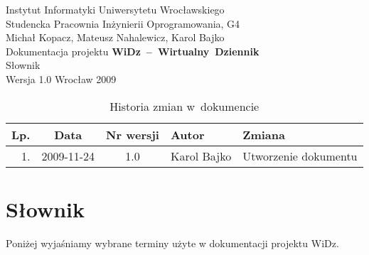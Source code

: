 \documentclass[12pt,leqno,twoside]{mwart}
\begin{document}
\begin{titlepage}
\begin{center}
Instytut Informatyki Uniwersytetu Wrocławskiego \\
Studencka Pracownia Inżynierii Oprogramowania, G4 \\
\vspace{4cm}
\Large Michał Kopacz, Mateusz Nahalewicz, Karol Bajko \\
\vspace{0.5cm}
\huge Dokumentacja projektu \mbox{\textbf{WiDz -- Wirtualny Dziennik}} \\ \Large Słownik\\
\vspace{1cm}
\normalsize Wersja 1.0
\vfill
\normalsize Wrocław 2009
\end{center}
\end{titlepage}

\newpage

\begin{table}
	\centering
	\caption{Historia zmian w~dokumencie}
		\begin{tabular}{|r|c|c|l|l|}
		\hline
		Lp. 	& Data       & Nr wersji 	& Autor           		& Zmiana \\ \hline
		1.   	& 2009-11-24 & 1.0       	& Karol Bajko & Utworzenie dokumentu \\ \hline
		\end{tabular}
\end{table}

\newpage

\tableofcontents

\newpage

\section{Słownik}
\noindent Poniżej wyjaśniamy wybrane terminy użyte w dokumentacji projektu WiDz.
\end{document}
